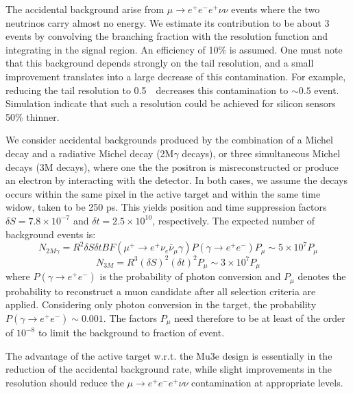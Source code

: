 The accidental background arise from $\mu \rightarrow e^+e^-e^+ \nu\nu$ events where the two 
neutrinos carry almost no energy. We estimate its contribution to be about 3 events by 
convolving the branching fraction with the resolution function and integrating in the 
signal region. An efficiency of 10\% is assumed. One must note that this background depends 
strongly on the tail resolution, and a small improvement translates into a large decrease 
of this contamination. For example, reducing the tail resolution to 0.5~\Mev\ decreases 
this contamination to $\sim 0.5$ event. Simulation indicate that such a resolution could be 
achieved for silicon sensors 50\% thinner.

We consider accidental backgrounds produced by the combination of a Michel decay and a radiative Michel 
decay (2M$\gamma$ decays), or three simultaneous Michel decays (3M decays), where one the the positron 
is misreconstructed or produce an electron by interacting with the detector. In both cases, we assume 
the decays occurs within the same pixel in the active target and within the same time widow, taken to 
be 250 ps. This yields position and time suppression factors $\delta S = 7.8\times 10^{-7}$ and 
$\delta t = 2.5\times 10^{10}$, respectively. The expected number of background events is:
%
$$N_{2M\gamma} = R^2 \delta S \delta t BF(\mu^+ \rightarrow e^+ \nu_e \bar\nu_\mu \gamma) P(\gamma \rightarrow e^+ e^-) P_\mu  \sim 5\times 10^7 P_\mu$$
$$N_{3M} = R^3(\delta S)^2 (\delta t)^2 P_\mu \sim 3 \times 10^7 P_\mu$$
%
where $P(\gamma \rightarrow e^+ e^-)$ is the probability of photon conversion and $P_\mu$ denotes the 
probability to reconstruct a muon candidate after all selection criteria are applied. Considering only 
photon conversion in the target, the probability $P(\gamma \rightarrow e^+ e^-) \sim 0.001$. The factors 
$P_\mu$ need therefore to be at least of the order of $10^{-8}$ to limit the background to fraction of 
event.

The advantage of the active target w.r.t. the Mu3e design is essentially in the reduction of the accidental 
background rate, while slight improvements in the resolution should reduce the $\mu \rightarrow e^+e^-e^+ \nu\nu$ 
contamination at appropriate levels. 

